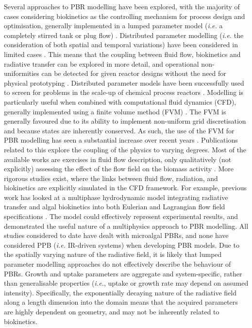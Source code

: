 Several approaches to PBR modelling have been explored, with the majority of cases considering biokinetics as the controlling mechanism for process design and optimisation, generally implemented in a lumped parameter model (\textit{i.e.} a completely stirred tank or plug flow) \cite{bechet2013, puyol2017}. Distributed parameter modelling (\textit{i.e.} the consideration of both spatial and temporal variations) have been considered in limited cases \cite{bitog2011}. This means that the coupling between fluid flow, biokinetics and radiative transfer can be explored in more detail, and operational non-uniformities can be detected for given reactor designs without the need for physical prototyping \cite{bitog2011}. Distributed parameter models have been successfully used to screen for problems in the scale-up of chemical process reactors \cite{santoro2017}. Modelling is particularly useful when combined with computational fluid dynamics (CFD), generally implemented using a finite volume method (FVM) \cite{versteeg1995}. The FVM is generally favoured due to its ability to implement non-uniform grid discretisation and because states are inherently conserved. As such, the use of the FVM for PBR modelling has seen a substantial increase over recent years \cite{bitog2011}. Publications related to this explore the coupling of the physics to varying degrees. Most of the available works are exercises in fluid flow description, only qualitatively (not explicitly) assessing the effect of the flow field on the biomass activity \cite{kayahan2016, ali2015, wang2014}. More rigorous studies exist, where the links between fluid flow, radiation, and biokinetics are explicitly simulated in the CFD framework. For example, previous work has looked at a multiphase hydrodynamic model integrating radiative transfer and algal biokinetics into both Eulerian and Lagrangian flow field specifications \cite{gao2016, gao2017}. The model could effectively represent experimental results, and demonstrated the useful nature of a multiphysics approach to PBR modelling. All studies considered to date have dealt with microalgal PBRs, and none have considered PPB (\textit{i.e.} IR-driven systems) when developing PBR models. 
\skippingparagraph
Due to the spatially varying nature of the radiative field, it is likely that lumped parameter modelling approaches do not effectively describe the behaviour of PBRs. 
Growth and uptake parameters are aggregate and system-specific, rather than generalisable properties (\textit{i.e.}, uptake or growth rate may depend on assumed intensity). Specifically, the exponentially decaying nature of the radiative field along a length dimension into the domain means that the acquired parameters are highly dependent on geometry, and may not be inherently related to biokinetics. 
